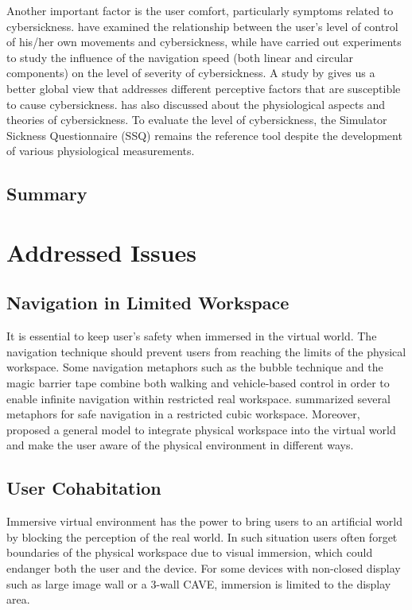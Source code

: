 Another important factor is the user comfort, particularly symptoms related to cybersickness. \citet{Rich1996AICS} have examined the relationship between the user's level of control of his/her own movements and cybersickness, while \citet{So2001ENS} have carried out experiments to study the influence of the navigation speed (both linear and circular components) on the level of severity of cybersickness. A study by \citet{Stanney2002HPIVE} gives us a better global view that addresses different perceptive factors that are susceptible to cause cybersickness. \citet{LaViola2000DCV} has also discussed about the physiological aspects and theories of cybersickness. To evaluate the level of cybersickness, the Simulator Sickness Questionnaire (SSQ) \citep{Kennedy1993SSQ} remains the reference tool despite the development of various physiological measurements.

\subsection{Summary}


\section{Addressed Issues}
\subsection{Navigation in Limited Workspace}
It is essential to keep user's safety when immersed in the virtual world. The navigation technique should prevent users from reaching the limits of the physical workspace. Some navigation metaphors such as the bubble technique \citep{Dominjon2005Bubble} and the magic barrier tape \citep{Cirio2009MBT} combine both walking and vehicle-based control in order to enable infinite navigation within restricted real workspace. \citet{Cirio2012Cube} summarized several metaphors for safe navigation in a restricted cubic workspace. Moreover, \citet{Fleury2010Generic} proposed a general model to integrate physical workspace into the virtual world and make the user aware of the physical environment in different ways.

\subsection{User Cohabitation}
Immersive virtual environment has the power to bring users to an artificial world by blocking the perception of the real world. In such situation users often forget boundaries of the physical workspace due to visual immersion, which could endanger both the user and the device. For some devices with non-closed display such as large image wall or a 3-wall CAVE, immersion is limited to the display area.


